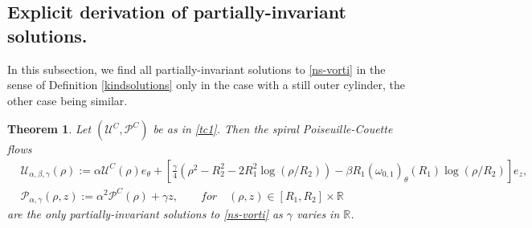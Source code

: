 \documentclass[a4paper,11pt]{amsart}
\newtheorem{theorem}{Theorem}[section]
\numberwithin{equation}{section}
\numberwithin{figure}{section}
\def\U{{\mathcal U}}
\def\P{{\mathcal P}}
\begin{document}
\subsection{Explicit derivation of partially-invariant solutions.} In this subsection, we find all partially-invariant solutions to \eqref{ns-vorti} in the sense of Definition \ref{kindsolutions} only in the case with a still outer cylinder, the other case being similar.
    
	\begin{theorem}\label{theo-tcg-vorti}
		Let $({ \U^C},{\P^C})$ be as in \eqref{tc1}. Then the spiral Poiseuille-Couette flows
		\begin{equation} \label{tcg-vorti}\begin{aligned}
				& \U_{\alpha,\beta,\gamma}(\rho) := \alpha\U^C(\rho)e_\theta+  \left[ \frac{\gamma}{4}\left(\rho^2 - R_2^2 -2R_1^2 \log (\rho/R_2)\right)  -\beta R_1(\omega_{0,1})_\theta(R_1)\log (\rho/R_2) \right] e_z,\\[5pt]
				&  \P_{\alpha,\gamma}(\rho,z) := \alpha^2\P^C(\rho)+ \gamma z, \qquad for \quad (\rho,z) \in[R_1,R_2]\times \mathbb{R}\,\end{aligned}
		\end{equation}
		are the only partially-invariant solutions  to \eqref{ns-vorti} as $\gamma$ varies in $\mathbb{R}$.
	\end{theorem}
\end{document}
